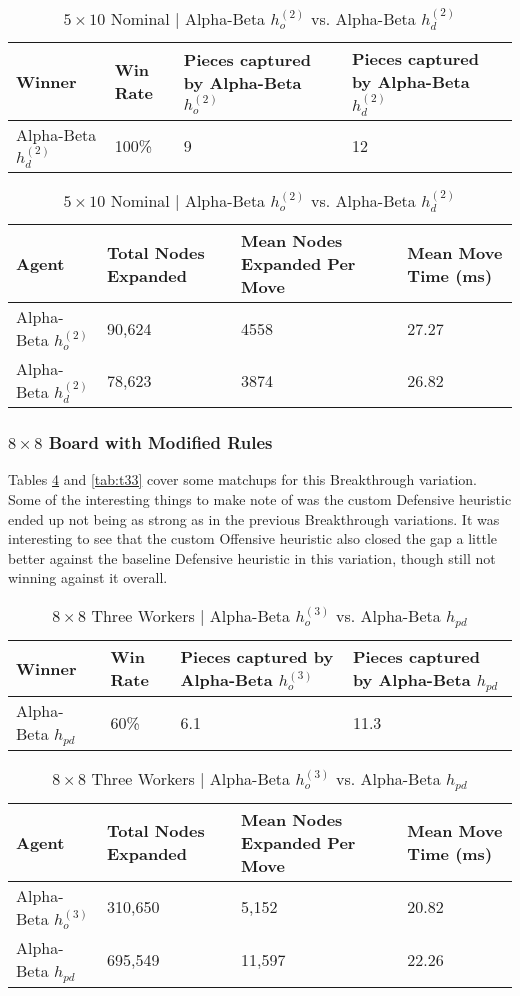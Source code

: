 \documentclass{article}[12pt]
\begin{document}
\begin{table}[ht]
	\centering
	\begin{tabular}{l | l | l | l}
		\hline
		Winner & Win Rate & Pieces captured by Alpha-Beta $h_{o}^{(2)}$ & Pieces captured by Alpha-Beta $h_{d}^{(2)}$ \\
		\hline \hline 
		Alpha-Beta $h_{d}^{(2)}$ & 100\% & 9 & 12 \\
		\hline
	\end{tabular}
	
	\vspace{10px}
	
	\begin{tabular}{l | l | l | l}
		\hline
		Agent & Total Nodes Expanded & Mean Nodes Expanded Per Move & Mean Move Time (ms) \\
		\hline \hline 
		Alpha-Beta $h_{o}^{(2)}$  & 90,624 & 4558 & 27.27 \\
		Alpha-Beta $h_{d}^{(2)}$ & 78,623 & 3874 & 26.82\\
		\hline
	\end{tabular}
	\caption{$5 \times 10$ Nominal | Alpha-Beta $h_{o}^{(2)}$ vs. Alpha-Beta $h_{d}^{(2)}$} \label{tab:t26}
\end{table}



	\subsubsection{$8 \times 8$ Board with Modified Rules}
	Tables \ref{tab:t32} and \ref{tab:t33} cover some matchups for this Breakthrough variation. Some of the interesting things to make note of was the custom Defensive heuristic ended up not being as strong as in the previous Breakthrough variations. It was interesting to see that the custom Offensive heuristic also closed the gap a little better against the baseline Defensive heuristic in this variation, though still not winning against it overall. 
   
   \begin{table}[ht]
   	\centering
   	\begin{tabular}{l | l | l | l}
   		\hline
   		Winner & Win Rate & Pieces captured by Alpha-Beta $h_{o}^{(3)}$ & Pieces captured by Alpha-Beta $h_{pd}$ \\
   		\hline \hline 
   		Alpha-Beta $h_{pd}$ & 60\% & 6.1 & 11.3 \\
   		\hline
   	\end{tabular}
   	
   	\vspace{10px}
   	
   	\begin{tabular}{l | l | l | l}
   		\hline
   		Agent & Total Nodes Expanded & Mean Nodes Expanded Per Move & Mean Move Time (ms) \\
   		\hline \hline 
   		Alpha-Beta $h_{o}^{(3)}$ & 310,650& 5,152& 20.82 \\
   		Alpha-Beta $h_{pd}$ &695,549 & 11,597 & 22.26\\
   		\hline
   	\end{tabular}
   	\caption{$8 \times8 $ Three Workers | Alpha-Beta $h_{o}^{(3)}$ vs. Alpha-Beta $h_{pd}$} \label{tab:t32}
   \end{table}
\end{document}
